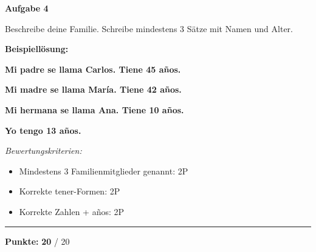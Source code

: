 \documentclass[11pt, a4paper]{article}
\newcommand{\fachfarbe}{spanisch}
\newcommand{\maxpunkte}{20}
\newcommand{\punktebox}[1]{\hfill\fbox{\small \_/#1}}
\newcommand{\loesung}[1]{\textcolor{loesung}{\textbf{#1}}}
\newenvironment{aufgabe}[1]{%
    \needspace{5\baselineskip}%
    \nopagebreak[4]%
    \vspace{10pt}
    \noindent\textbf{\textcolor{\fachfarbe}{Aufgabe #1}}
    \nopagebreak[4]%
    \vspace{5pt}
    \nopagebreak[4]%
    \begin{list}{}{\leftmargin=0pt}
    \item[]
}{%
    \end{list}
}
\begin{document}
\vspace{15pt}


\begin{aufgabe}{4}
Beschreibe deine Familie. Schreibe mindestens 3 Sätze mit Namen und Alter. \punktebox{6}
\end{aufgabe}

\textbf{Beispiellösung:}

\loesung{Mi padre se llama Carlos. Tiene 45 años.}

\loesung{Mi madre se llama María. Tiene 42 años.}

\loesung{Mi hermana se llama Ana. Tiene 10 años.}

\loesung{Yo tengo 13 años.}

\vspace{0.5em}

\textit{\textcolor{grau}{Bewertungskriterien:}}
\begin{itemize}
    \item Mindestens 3 Familienmitglieder genannt: 2P
    \item Korrekte tener-Formen: 2P
    \item Korrekte Zahlen + años: 2P
\end{itemize}

\vspace{20pt}
\hrule
\vspace{10pt}

\begin{flushright}
\textbf{Punkte:} \loesung{\maxpunkte} / \maxpunkte
\end{flushright}
\end{document}
